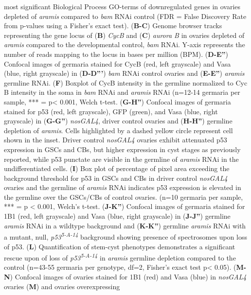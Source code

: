 \documentclass[12pt,oneside]{reedthesis}
\begin{document}
most significant Biological Process GO-terms of downregulated genes in
ovaries depleted of \emph{aramis} compared to \emph{bam} RNAi control (FDR = False
Discovery Rate from p-values using a Fisher's exact test). (\textbf{B-C})
Genome browser tracks representing the gene locus of (\textbf{B}) \emph{CycB} and
(\textbf{C}) \emph{aurora B} in ovaries depleted of \emph{aramis} compared to the
developmental control, \emph{bam} RNAi. Y-axis represents the number of reads
mapping to the locus in bases per million (BPM). (\textbf{D-E''}) Confocal
images of germaria stained for CycB (red, left grayscale) and Vasa
(blue, right grayscale) in (\textbf{D-D'''}) \emph{bam} RNAi control ovaries and
(\textbf{E-E''}) \emph{aramis} germline RNAi. (\textbf{F}) Boxplot of CycB intensity in
the germline normalized to Cyc B intensity in the soma in \emph{bam} RNAi and
\emph{aramis} RNAi (n=12-14 germaria per sample, *** = p\textless{} 0.001, Welch
t-test. (\textbf{G-H''}) Confocal images of germaria stained for p53 (red,
left grayscale), GFP (green), and Vasa (blue, right grayscale) in
(\textbf{G-G''}) \emph{nosGAL4}, driver control ovaries and (\textbf{H-H''}) germline
depletion of \emph{aramis}. Cells highlighted by a dashed yellow circle
represent cell shown in the inset. Driver control \emph{nosGAL4} ovaries
exhibit attenuated p53 expression in GSCs and CBs, but higher expression
in cyst stages as previously reported, while p53 punctate are visible in
the germline of \emph{aramis} RNAi in the undifferentiated cells. (\textbf{I}) Box
plot of percentage of pixel area exceeding the background threshold for
p53 in GSCs and CBs in driver control \emph{nosGAL4} ovaries and the germline
of \emph{aramis} RNAi indicates p53 expression is elevated in the germline
over the GSCs/CBs of control ovaries. (n=10 germaria per sample, ***
= p \textless{} 0.001, Welch's t-test. (\textbf{J-K''}) Confocal images of germaria
stained for 1B1 (red, left grayscale) and Vasa (blue, right grayscale)
in (\textbf{J-J''}) germline \emph{aramis} RNAi in a wildtype background and
(\textbf{K-K''}) germline \emph{aramis} RNAi with a mutant, null, \emph{p53\textsuperscript{5-A-14}}
background showing presence of spectrosomes upon loss of p53. (\textbf{L})
Quantification of stem-cyst phenotypes demonstrates a significant rescue
upon of loss of \emph{p53\textsuperscript{5-A-14}} in \emph{aramis} germline depletion compared to
the control (n=43-55 germaria per genotype, df=2, Fisher's exact test
p\textless{} 0.05). (\textbf{M-N}) Confocal images of ovaries stained for 1B1 (red)
and Vasa (blue) in \emph{nosGAL4} ovaries (\textbf{M}) and ovaries overexpressing
\end{document}
